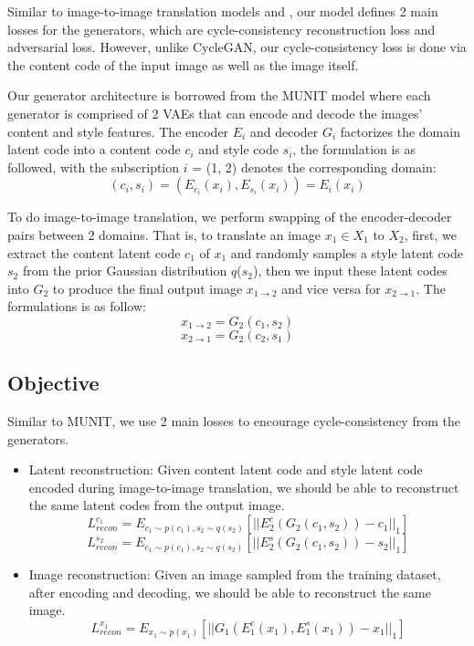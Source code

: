 \documentclass[12pt]{report}
\begin{document}
Similar to image-to-image translation models \cite{cycle-gan}\cite{bicycle-gan}\cite{disco-gan} and \cite{munit}, our model defines 2 main losses for the generators, which are cycle-consistency reconstruction loss and adversarial loss. However, unlike CycleGAN, our cycle-consistency loss is done via the content code of the input image as well as the image itself.

Our generator architecture is borrowed from the MUNIT model \cite{munit} where each generator is comprised of 2 VAEs that can encode and decode the images' content and style features. The encoder $E_i$ and decoder $G_i$ factorizes the domain latent code into a content code $c_i$ and style code $s_i$, the formulation is as followed, with the subscription $i$ = (1, 2) denotes the corresponding domain:
\[(c_i, s_i) =  (E_{c_i}(x_i), E_{s_i}(x_i)) = E_i(x_i)\]

To do image-to-image translation, we perform swapping of the encoder-decoder pairs between 2 domains. That is, to translate an image $x_1$$\in$$X_1$ to $X_2$, first, we extract the content latent code $c_1$ of $x_1$ and randomly samples a style latent code $s_2$ from the prior Gaussian distribution $q$($s_2$), then we input these latent codes into $G_2$ to produce the final output image $x_{1\rightarrow2}$ and vice versa for $x_{2\rightarrow1}$. The formulations is as follow:
\[x_{1\rightarrow2} = G_2(c_1, s_2)\]
\[x_{2\rightarrow1} = G_2(c_2, s_1)\]

\subsection{Objective}
Similar to MUNIT\cite{munit}, we use 2 main losses to encourage cycle-consistency from the generators.
\begin{itemize}
	\item Latent reconstruction: Given content latent code and style latent code encoded during image-to-image translation, we should be able to reconstruct the same latent codes from the output image.
\[L^{c_1}_{recon} = E_{{c_1}\sim p(c_1), s_2 \sim q(s_2)}[||E^c_2(G_2(c_1,s_2)) - c_1||_1]\]
\[L^{s_2}_{recon} = E_{{c_1}\sim p(c_1), s_2 \sim q(s_2)}[||E^s_2(G_2(c_1,s_2)) - s_2||_1]\]
	\item Image reconstruction: Given an image sampled from the training dataset, after encoding and decoding, we should be able to reconstruct the same image.
\[L^{x_1}_{recon} = E_{{x_1}\sim p(x_1)}[||G_1(E^c_1(x_1), E^s_1(x_1)) - x_1||_1]\]
\end{itemize}
\end{document}
